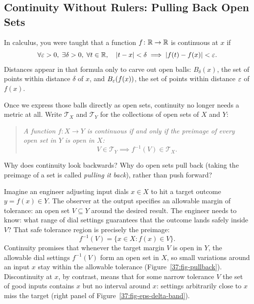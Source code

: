 \subsection{Continuity Without Rulers: Pulling Back Open Sets}

In calculus, you were taught that a function $f\colon \mathbb{R} \to \mathbb{R}$ is continuous at $x$ if
\[
\forall \varepsilon > 0, \; \exists \delta > 0, \; \forall t \in \mathbb{R}, \quad |t - x| < \delta \implies |f(t) - f(x)| < \varepsilon.
\]
Distances appear in that formula only to carve out open balls: $B_\delta(x)$, the set of points within distance $\delta$ of $x$, and $B_\varepsilon(f(x))$, the set of points within distance $\varepsilon$ of $f(x)$.

Once we express those balls directly as open sets, continuity no longer needs a metric at all. Write $\mathcal{T}_X$ and $\mathcal{T}_Y$ for the collections of open sets of $X$ and $Y$:
\begin{quote}
\emph{A function $f\colon X \to Y$ is continuous if and only if the preimage of every open set in $Y$ is open in $X$:}
\[
V \in \mathcal{T}_Y \implies f^{-1}(V) \in \mathcal{T}_X.
\]
\end{quote}

Why does continuity look backwards? Why do open sets pull back (taking the preimage of a set is called \emph{pulling it back}), rather than push forward?

Imagine an engineer adjusting input dials $x \in X$ to hit a target outcome $y = f(x) \in Y$. The observer at the output specifies an allowable margin of tolerance: an open set $V \subseteq Y$ around the desired result. The engineer needs to know: what range of dial settings guarantees that the outcome lands safely inside $V$? That safe tolerance region is precisely the preimage:
\[
f^{-1}(V) = \{x \in X : f(x) \in V\}.
\]
Continuity promises that whenever the target margin $V$ is open in $Y$, the allowable dial settings $f^{-1}(V)$ form an open set in $X$, so small variations around an input $x$ stay within the allowable tolerance (Figure~\ref{37:fig-pullback}). Discontinuity at $x$, by contrast, means that for some narrow tolerance $V$ the set of good inputs contains $x$ but no interval around $x$: settings arbitrarily close to $x$ miss the target (right panel of Figure~\ref{37:fig-eps-delta-band}).

